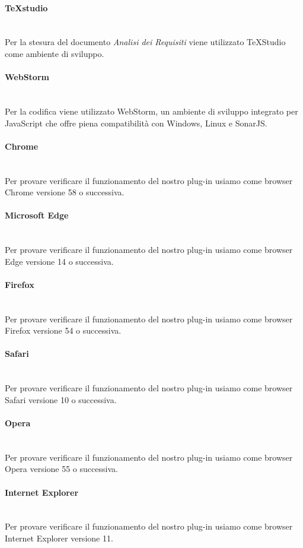 		\paragraph{TeXstudio}\mbox{}\\ [1mm]
		Per la stesura del documento \textit{Analisi dei Requisiti} viene utilizzato TeXStudio come ambiente di sviluppo.
		\paragraph{WebStorm}\mbox{}\\ [1mm]
		Per la codifica viene utilizzato WebStorm, un ambiente di sviluppo integrato per JavaScript che offre piena compatibilità con Windows, Linux e SonarJS\glo.
		\paragraph{Chrome}\mbox{}\\ [1mm]
		Per provare verificare il funzionamento del nostro plug-in usiamo come browser Chrome versione 58 o successiva.
		\paragraph{Microsoft Edge}\mbox{}\\ [1mm]
		Per provare verificare il funzionamento del nostro plug-in usiamo come browser Edge versione 14 o successiva.
		\paragraph{Firefox}\mbox{}\\ [1mm]
		Per provare verificare il funzionamento del nostro plug-in usiamo come browser Firefox versione 54 o successiva.
		\paragraph{Safari}\mbox{}\\ [1mm]
		Per provare verificare il funzionamento del nostro plug-in usiamo come browser Safari versione 10 o successiva.
		\paragraph{Opera}\mbox{}\\ [1mm]
		Per provare verificare il funzionamento del nostro plug-in usiamo come browser Opera versione 55 o successiva.
		\paragraph{Internet Explorer}\mbox{}\\ [1mm]
		Per provare verificare il funzionamento del nostro plug-in usiamo come browser Internet Explorer versione 11.
